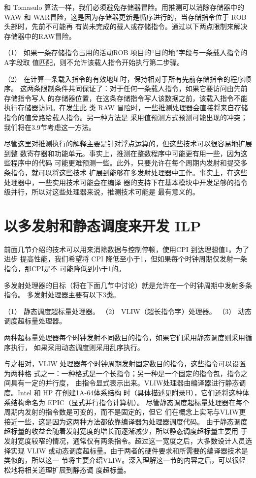 和 Tomasulo 算法一样，我们必须避免存储器冒险。用推测可以消除存储器中的 WAW 和
WAR冒险，这是因为存储器更新是循序进行的，当存储指令位于 ROB 头部时，先前不可能再
有尚未完成的载人或存储指令。通过以下两点限制来解决存储器中的RAW冒险。

（1） 如果一条存储指令占用的活动ROB 项目的“目的地”字段与一条载入指令的A字段取
值匹配，则不允许该载人指令开始执行第二步骤。

（2） 在计算一条载入指令的有效地址时，保持相对于所有先前存储指令的程序顺序。
这两条限制条件共同保证了：对于任何一条载人指令，如果它要访问由先前存储指令写人
的存储器位置，在这条存储指令写人该数据之前，该载入指令不能执行存储器访问。在发生此
类 RAW 冒险时，一些推测处理器会直接将来自存储指令的值旁路给载人指令。另一种方法是
采用值预测方式预测可能出现的冲突；我们将在3.9节考虑这一方法。

尽管这里对推测执行的解释主要是针对浮点运算的，但这些技术可以很容易地扩展到整
数寄存器和功能单元。事实上，推测在整数程序中可能更有用一些，因为这些程序中的代码
可能更难预测一些。此外，只要允许在每个周期内发射和提交多条指令，就可以将这些技术
扩展到能够在多发射处理器中工作。事实上，在这些处理器中，一些实用技术可能会在编译
器的支持下在基本模块中开发足够的指令级并行，所以对这些处理器来说，推测技术可能是
最有意义的。

\section{以多发射和静态调度来开发 ILP}
前面几节介绍的技术可以用来消除数据与控制停顿，使用CPI 到达理想值1。为了进步
提高性能，我们希望将 CPI 降低至小于1，但如果每个时钟周期仅发射一条指令，那CPI是不
可能降低到小于1的。

多发射处理器的目标（将在下面几节中讨论）就是允许在一个时钟周期中发射多条指令。
多发射处理器主要有以下3类。

（1） 静态调度超标量处理器。
（2） VLIW（超长指令字）处理器。
（3） 动态调度超标量处理器。

两种超标量处理器每个时钟发射不同数目的指令，如果它们采用静态调度则采用循序执行，
如果采用动态调度则采用乱序执行。

与之相对，VLIW 处理器每个时钟周期发射固定数目的指令，这些指令可以设置为两种格
式之一：一种格式是一个长指令；另一种是一个固定的指令包，指令之间具有一定的并行度，
由指令显式表示出来。VLIW处理器由编译器进行静态调度。Intel 和 HP 在创建1A-64体系结构
时（具体描述见附录H），它们还将这种体系结构命名为 EPIC（显式并行指令计算机）。
尽管静态调度超标量处理器在每个周期内发射的指令数是可变的，而不是固定的，但它
们在概念上实际与VLIW更接近一些，这是因为这两种方法都依靠编译器为处理器调度代码。
由于静态调度超标量的收益会随着发射宽度的增长而逐渐减少，所以静态调度超标量主要用
于发射宽度较窄的情况，通常仅有两条指令。超过这一宽度之后，大多数设计人员选择实现
VLIW 或动态调度超标量。由于两者的硬件要求和所需要的编译器技术是类似的，所以这一
节将主要介绍VLIW。深入理解这一节的内容之后，可以很轻松地将相关道理扩展到静态调
度超标量。

